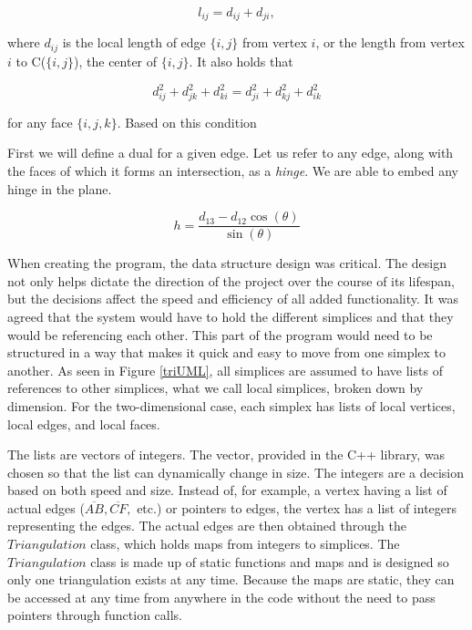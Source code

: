 \documentclass[12pt]{article}
\begin{document}
$$l_{ij} = d_{ij} + d_{ji},$$

\noindent where $d_{ij}$ is the local length of edge $\{i, j\}$ from vertex $i$, or the length from vertex $i$ to C($\{i, j\}$), the center of $\{i, j\}$. It also holds that 

$$d_{ij}^2 + d_{jk}^2 + d_{ki}^2 = d_{ji}^2 + d_{kj}^2 + d_{ik}^2$$ 

\noindent for any face $\{i, j, k\}$. Based on this condition\newline

\noindent First we will define a dual for a given edge. Let us refer to any edge, along with the faces of which it forms an intersection, as a \textit{hinge}. We are able to embed any hinge in the plane. 

$$ h = \frac{d_{13} - d_{12}\cos(\theta)}{\sin(\theta)} $$

When creating the program, the data structure design was critical. The design not only helps dictate the direction of the project over the course of its lifespan, but the decisions affect the speed and efficiency of all added functionality. It was agreed that the system would have to hold the different simplices and that they would be referencing each other. This part of the program would need to be structured in a way that makes it quick and easy to move from one simplex to another. As seen in Figure \ref{triUML}, all simplices are assumed to have lists of references to other simplices, what we call local simplices, broken down by dimension. For the two-dimensional case, each simplex has lists of local vertices, local edges, and local faces.\newline

\noindent The lists are vectors of integers. The vector, provided in the C++ library, was chosen so that the list can dynamically change in size. The integers are a decision based on both speed and size. Instead of, for example, a vertex having a list of actual edges ($\overline{AB}, \overline{CF},$ etc.) or pointers to edges, the vertex has a list of integers representing the edges. The actual edges are then obtained through the $Triangulation$ class, which holds maps from integers to simplices. The $Triangulation$ class is made up of static functions and maps and is designed so only one triangulation exists at any time. Because the maps are static, they can be accessed at any time from anywhere in the code without the need to pass pointers through function calls. \newline
\end{document}
